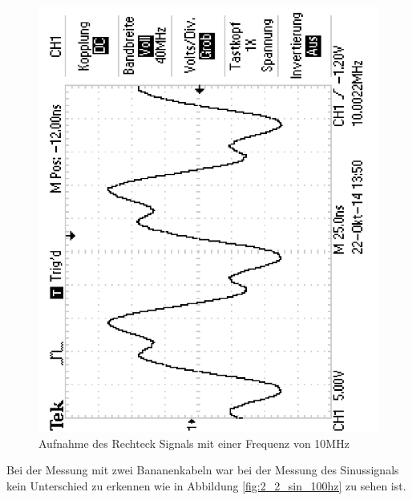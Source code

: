 \documentclass[12pt,a4paper]{article}
\begin{document}
\begin{figure}[H] 
  \centering
    \includegraphics[scale = 0.4, angle = -90]{2_1_rech_10mhz.pdf}
  	\caption[Aufnahme des Rechtecksignals mit einer Frequenz von 10MHz]{Aufnahme des Rechteck Signals mit einer Frequenz von 10MHz}
  \label{fig:2_1_rech_10mhz}
\end{figure}

Bei der Messung mit zwei Bananenkabeln war bei der Messung des Sinussignals kein Unterschied zu erkennen wie in Abbildung \ref{fig:2_2_sin_100hz} zu sehen ist.
\end{document}
